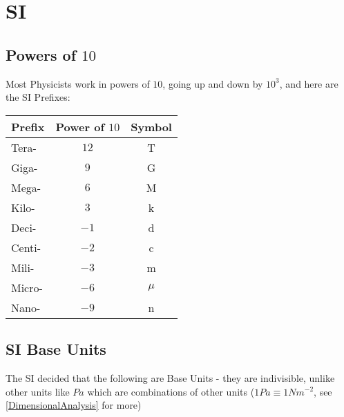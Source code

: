 

\chapter{SI}

\section{Powers of \(10\)}
Most Physicists work in powers of \(10\), going up and down by \(10^3\), and here are the SI Prefixes: \\
\begin{tabular}{lcc}
	Prefix & Power of \(10\) & Symbol \\
	\hline
	Tera-	 & \(12\)			 & T \\
	Giga-	 & \(9\)			  & G \\
	Mega-	 & \(6\)			  & M \\
	Kilo-	 & \(3\)			  & k \\
	Deci-	 & \(-1\)			 & d \\
	Centi-	 & \(-2\)			 & c \\
	Mili-	 & \(-3\)			 & m \\
	Micro-	 & \(-6\)			 & \(\mu\) \\
	Nano-	 & \(-9\)			 & n \\
\end{tabular}


\section{SI Base Units}
The SI decided that the following are Base Units - they are indivisible, unlike other units like \(Pa\) which are combinations of other units (\(1 Pa \equiv 1 Nm^{-2}\), see \eqref{DimensionalAnalysis} for more) \\

